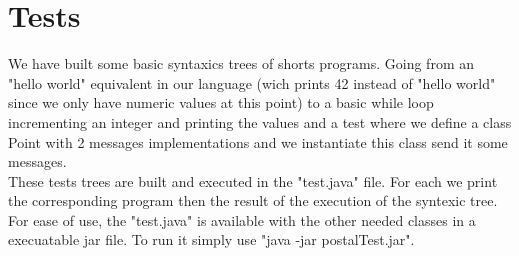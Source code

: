 \documentclass{eplDoc}
\begin{document}
\section{Tests}

We have built some basic syntaxics trees of shorts programs. Going from an "hello world" equivalent in our language (wich prints 42 instead of "hello world" since we only have numeric values at this point) to a basic while loop incrementing an integer and printing the values and a test where we define a class Point with 2 messages implementations and we instantiate this class send it some messages.\\ 
These tests trees are built and executed in the "test.java" file. For each we print the corresponding program then the result of the execution of the syntexic tree. \\ 
For ease of use, the "test.java" is available with the other needed classes in a execuatable jar file. To run it simply use "java -jar postalTest.jar".
\end{document}
